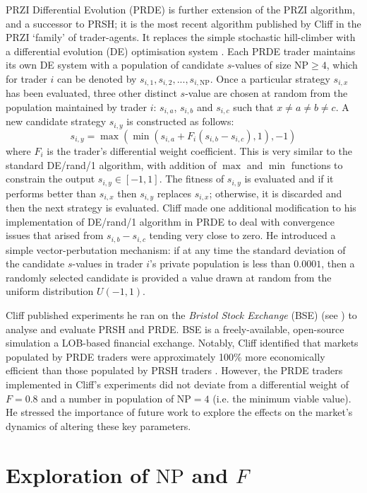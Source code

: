 \documentclass[conference]{IEEEtran}
\begin{document}
PRZI Differential Evolution (PRDE) \cite{PRDE} is further extension of the PRZI algorithm, and a successor to PRSH; it is the most recent algorithm published by Cliff in the PRZI `family' of trader-agents.
It replaces the simple stochastic hill-climber with a differential evolution (DE) optimisation system \cite{StornPrice}.
Each PRDE trader maintains its own DE system with a population of candidate $s$-values of size $\mathrm{NP}\ge4$, which for trader $i$ can be denoted by $s_{i,1},s_{i,2},...,s_{i,\mathrm{NP}}$.
Once a particular strategy $s_{i,x}$ has been evaluated, three other distinct $s$-value are chosen at random from the population maintained by trader $i$: $s_{i,a}$, $s_{i,b}$ and $s_{i,c}$ such that $x\ne a\ne b\ne c$.
A new candidate strategy $s_{i,y}$ is constructed as follows:
\[
s_{i,y}=\max(\min(s_{i,a}+F_i(s_{i,b}-s_{i,c}),1), -1)
\]
where $F_i$ is the trader's differential weight coefficient.
This is very similar to the standard DE/rand/1 algorithm, with addition of $\max$ and $\min$ functions to constrain the output $s_{i,y}\in[-1,1]$.
The fitness of $s_{i,y}$ is evaluated and if it performs better than $s_{i,x}$ then $s_{i,y}$ replaces $s_{i,x}$; otherwise, it is discarded and then the next strategy is evaluated.
Cliff made one additional modification to his implementation of DE/rand/1 algorithm in PRDE to deal with convergence issues that arised from $s_{i,b}-s_{i,c}$ tending very close to zero.
He introduced a simple vector-perbutation mechanism: if at any time the standard deviation of the candidate $s$-values in trader $i$'s private population is less than $0.0001$, then a randomly selected candidate is provided a value drawn at random from the uniform distribution $U(-1,1)$.

Cliff published experiments he ran on the \textit{Bristol Stock Exchange} (BSE) (see \cite{BSE, BSEPaper}) to analyse and evaluate PRSH and PRDE.
BSE is a freely-available, open-source simulation a LOB-based financial exchange.
Notably, Cliff identified that markets populated by PRDE traders were approximately 100\% more economically efficient than those populated by PRSH traders \cite{PRDE}.
However, the PRDE traders implemented in Cliff's experiments did not deviate from a differential weight of $F=0.8$ and a number in population of $\mathrm{NP}=4$ (i.e. the minimum viable value).
He stressed the importance of future work to explore the effects on the market's dynamics of altering these key parameters.

\section{Exploration of $\mathrm{NP}$ and $F$}
\end{document}
